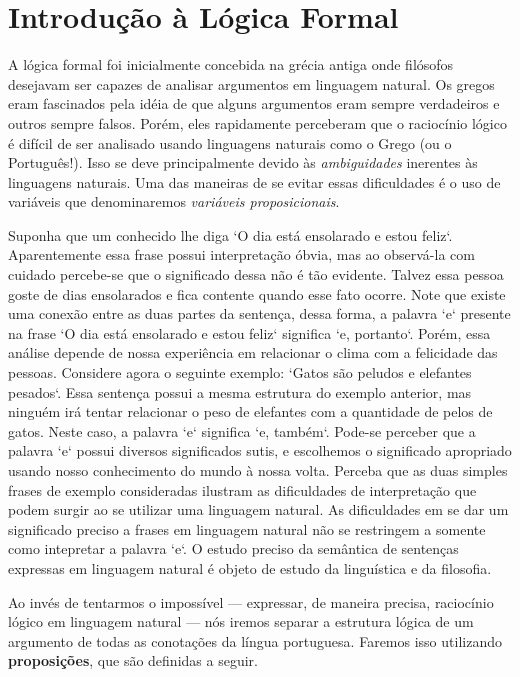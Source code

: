 \section{Introdu\c{c}\~ao \`a L\'ogica Formal}\label{cap1:sec1}

A l\'ogica formal foi inicialmente concebida na gr\'ecia antiga onde fil\'osofos desejavam ser capazes de analisar argumentos 
em linguagem natural. Os gregos eram fascinados pela id\'eia de que alguns argumentos eram sempre verdadeiros e outros sempre
falsos. Por\'em, eles rapidamente perceberam que o racioc\'inio l\'ogico \'e dif\'icil de ser analisado usando linguagens naturais
como o Grego (ou o Portugu\^es!). Isso se deve principalmente devido \`as \emph{ambiguidades} inerentes \`as linguagens naturais.
Uma das maneiras de se evitar essas dificuldades \'e o uso de vari\'aveis que denominaremos \emph{vari\'aveis proposicionais}. 

Suponha que um conhecido lhe diga `O dia est\'a ensolarado e estou feliz`. Aparentemente essa frase possui interpreta\c{c}\~ao
\'obvia, mas ao observ\'a-la com cuidado percebe-se que o significado dessa n\~ao \'e t\~ao evidente. Talvez essa pessoa goste
de dias ensolarados e fica contente quando esse fato ocorre. Note que existe uma conex\~ao entre as duas partes da senten\c{c}a,
dessa forma, a palavra `e` presente na frase `O dia est\'a ensolarado e estou feliz` significa `e, portanto`. Por\'em, essa an\'alise
depende de nossa experi\^encia em relacionar o clima com a felicidade das pessoas. Considere agora o seguinte exemplo: 
`Gatos s\~ao peludos e elefantes pesados`. Essa senten\c{c}a possui a mesma estrutura do exemplo anterior, mas ningu\'em ir\'a tentar
relacionar o peso de elefantes com a quantidade de pelos de gatos. Neste caso, a palavra `e` significa `e, tamb\'em`. Pode-se perceber que a
palavra `e` possui diversos significados sutis, e escolhemos o significado apropriado usando nosso conhecimento do mundo \`a nossa volta.
Perceba que as duas simples frases de exemplo consideradas ilustram as dificuldades de interpreta\c{c}\~ao que podem surgir ao se utilizar
uma linguagem natural. As dificuldades em se dar um significado preciso a frases em linguagem natural n\~ao se restringem a somente como 
intepretar a palavra `e`. O estudo preciso da sem\^antica de senten\c{c}as expressas em linguagem natural \'e objeto de estudo da lingu\'istica
e da filosofia.

Ao inv\'es de tentarmos o imposs\'ivel --- expressar, de maneira precisa,  racioc\'inio l\'ogico em linguagem natural  --- n\'os iremos separar
a estrutura l\'ogica de um argumento de todas as conota\c{c}\~oes da l\'ingua portuguesa. Faremos isso utilizando \textbf{proposi\c{c}\~oes}, que
s\~ao definidas a seguir.

